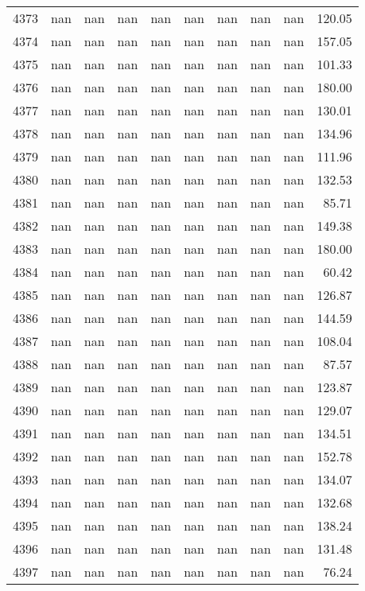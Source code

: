 \begin{tabular}{lrrrrrrrrr}
4373 & nan & nan & nan & nan & nan & nan & nan & nan & 120.05 \\
4374 & nan & nan & nan & nan & nan & nan & nan & nan & 157.05 \\
4375 & nan & nan & nan & nan & nan & nan & nan & nan & 101.33 \\
4376 & nan & nan & nan & nan & nan & nan & nan & nan & 180.00 \\
4377 & nan & nan & nan & nan & nan & nan & nan & nan & 130.01 \\
4378 & nan & nan & nan & nan & nan & nan & nan & nan & 134.96 \\
4379 & nan & nan & nan & nan & nan & nan & nan & nan & 111.96 \\
4380 & nan & nan & nan & nan & nan & nan & nan & nan & 132.53 \\
4381 & nan & nan & nan & nan & nan & nan & nan & nan & 85.71 \\
4382 & nan & nan & nan & nan & nan & nan & nan & nan & 149.38 \\
4383 & nan & nan & nan & nan & nan & nan & nan & nan & 180.00 \\
4384 & nan & nan & nan & nan & nan & nan & nan & nan & 60.42 \\
4385 & nan & nan & nan & nan & nan & nan & nan & nan & 126.87 \\
4386 & nan & nan & nan & nan & nan & nan & nan & nan & 144.59 \\
4387 & nan & nan & nan & nan & nan & nan & nan & nan & 108.04 \\
4388 & nan & nan & nan & nan & nan & nan & nan & nan & 87.57 \\
4389 & nan & nan & nan & nan & nan & nan & nan & nan & 123.87 \\
4390 & nan & nan & nan & nan & nan & nan & nan & nan & 129.07 \\
4391 & nan & nan & nan & nan & nan & nan & nan & nan & 134.51 \\
4392 & nan & nan & nan & nan & nan & nan & nan & nan & 152.78 \\
4393 & nan & nan & nan & nan & nan & nan & nan & nan & 134.07 \\
4394 & nan & nan & nan & nan & nan & nan & nan & nan & 132.68 \\
4395 & nan & nan & nan & nan & nan & nan & nan & nan & 138.24 \\
4396 & nan & nan & nan & nan & nan & nan & nan & nan & 131.48 \\
4397 & nan & nan & nan & nan & nan & nan & nan & nan & 76.24 \\

\end{tabular}
